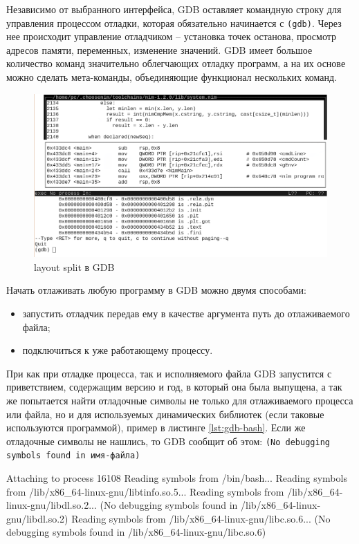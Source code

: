 Независимо от выбранного интерфейса, GDB оставляет командную строку для 
управления процессом отладки, которая обязательно начинается с \verb|(gdb)|.
Через нее происходит управление отладчиком -- установка точек останова,
просмотр адресов памяти, переменных, изменение значений.
GDB имеет большое количество команд значительно облегчающих отладку программ, 
а на их основе можно сделать мета-команды, объединяющие функционал нескольких
команд.

\begin{figure}[!hbtp]
    \includegraphics[width=\textwidth,height=\textheight,keepaspectratio]{images/split-layout.png}
    \caption{layout split в GDB\label{fig:layout-split}}
\end{figure}

Начать отлаживать любую программу в GDB можно двумя способами:
\begin{itemize}
    \item запустить отладчик передав ему в качестве аргумента путь до отлаживаемого файла;
    \item подключиться к уже работающему процессу.
\end{itemize}

При как при отладке процесса, так и исполняемого файла GDB
запустится с приветствием, содержащим версию и год, в который она была выпущена,
а так же попытается найти отладочные символы не только для отлаживаемого процесса или файла, 
но и для используемых динамических библиотек (если таковые используются программой),
пример в листинге \autoref{lst:gdb-bash}.
Если же отладочные символы не нашлись, то GDB сообщит об этом:
\verb|(No debugging symbols found in имя-файла)|

\begin{ListingEnv}[!h]
    \captiondelim{ }
    \caption{Отладка Bash}\label{lst:gdb-bash}
    \small
    \begin{Verb}[]
        Attaching to process 16108
        Reading symbols from /bin/bash...
        Reading symbols from /lib/x86_64-linux-gnu/libtinfo.so.5...
        Reading symbols from /lib/x86_64-linux-gnu/libdl.so.2...
        (No debugging symbols found in /lib/x86_64-linux-gnu/libdl.so.2)
        Reading symbols from /lib/x86_64-linux-gnu/libc.so.6...
        (No debugging symbols found in /lib/x86_64-linux-gnu/libc.so.6)
    \end{Verb}
\end{ListingEnv}
\newpage

